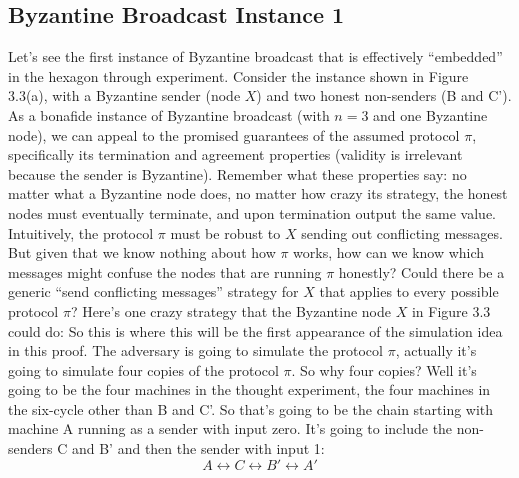 \subsection{Byzantine Broadcast Instance 1}
Let’s see the first instance of Byzantine broadcast that is effectively “embedded” in the
hexagon through experiment. Consider the instance shown in Figure 3.3(a), with a Byzantine sender (node $X$) and two honest non-senders (B and C'). As a bonafide instance of Byzantine broadcast (with $n = 3$ and one Byzantine node), we can appeal to the promised
guarantees of the assumed protocol $\pi$, specifically its termination and agreement properties
(validity is irrelevant because the sender is Byzantine). Remember what these properties
say: no matter what a Byzantine node does, no matter how crazy its strategy, the honest
nodes must eventually terminate, and upon termination output the same value.
Intuitively, the protocol $\pi$ must be robust to $X$ sending out conflicting messages. But
given that we know nothing about how $\pi$ works, how can we know which messages might
confuse the nodes that are running $\pi$ honestly? Could there be a generic “send conflicting
messages” strategy for $X$ that applies to every possible protocol $\pi$?
Here’s one crazy strategy that the Byzantine node $X$ in Figure 3.3 could do:
So this is where this will be the first appearance of the simulation idea in this proof. The adversary is
going to simulate the protocol $\pi$, actually it's going to simulate four copies of the protocol $\pi$.
So why four copies? Well it's going to be the four machines in the thought experiment, the four machines in the six-cycle other than B and C'. So that's going to be the chain starting with machine A running as a
sender with input zero. It's going to include the non-senders C and B' and then the sender with input 1:
$$A \leftrightarrow C \leftrightarrow B' \leftrightarrow A'$$

